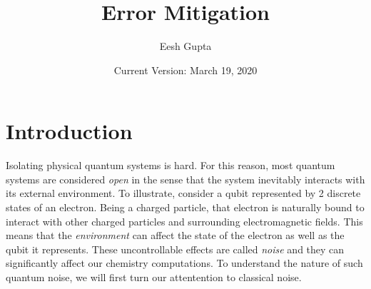 \documentclass{article}
\title{Error Mitigation}
\author{Eesh Gupta }
\date{Current Version: March 19, 2020}
\begin{document}
\maketitle
\tableofcontents
\newpage
\section{Introduction}
Isolating physical quantum systems is hard. For this reason, most quantum
systems are considered \textit{open} in the sense that the system
inevitably interacts with its external environment. To illustrate, consider
a qubit represented by 2 discrete states of an electron. Being a charged
particle, that electron is naturally bound to interact with other charged
particles and surrounding electromagnetic fields. This means that the
\textit{environment} can affect the state of the electron as well as the
qubit it represents. These uncontrollable effects are called \textit{noise}
and they can significantly affect our chemistry computations. To understand
the nature of such quantum noise, we will first turn our attentention to
classical noise.
\end{document}
